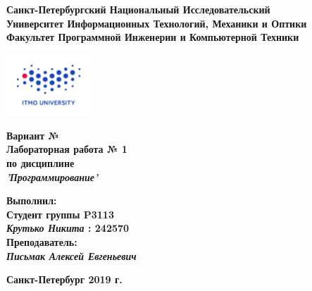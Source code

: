 \documentclass[11pt]{article}
\author{Крутько Никита}
\date{\today}
\title{}
\begin{document}
\large
\thispagestyle{empty}
\begin{center}
\textbf{Санкт-Петербургский Национальный Исследовательский}\\
\textbf{Университет Информационных Технологий, Механики и Оптики}\\
\textbf{Факультет Программной Инженерии и Компьютерной Техники}\\
\end{center}
\vspace{1em}
\begin{center}
\includegraphics[width=120px]{./itmo-logo.png}
\end{center}
\LARGE
\vspace{5em}
\begin{center}
\textbf{Вариант №}\\
\textbf{Лабораторная работа № 1}\\
\Large
\textbf{по дисциплине}\\
\LARGE
\textbf{\emph{'Программирование'}}\\
\end{center}
\vspace{11em}
\large
\begin{flushright}
\textbf{Выполнил:}\\
\textbf{Студент группы P3113}\\
\textbf{\emph{Крутько Никита} : 242570}\\
\textbf{Преподаватель:}\\
\textbf{\emph{Письмак Алексей Евгеньевич}}\\
\end{flushright}
\vspace{4em}
\large
\begin{center}
\textbf{Санкт-Петербург 2019 г.}
\end{center}
\pagebreak{}
\setcounter{tocdepth}{2}
\tableofcontents
\vspace{2em}
\end{document}
